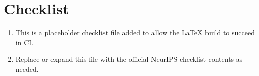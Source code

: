 \section*{Checklist}
\begin{enumerate}
  \item This is a placeholder checklist file added to allow the LaTeX build to succeed in CI.
  \item Replace or expand this file with the official NeurIPS checklist contents as needed.
\end{enumerate}
